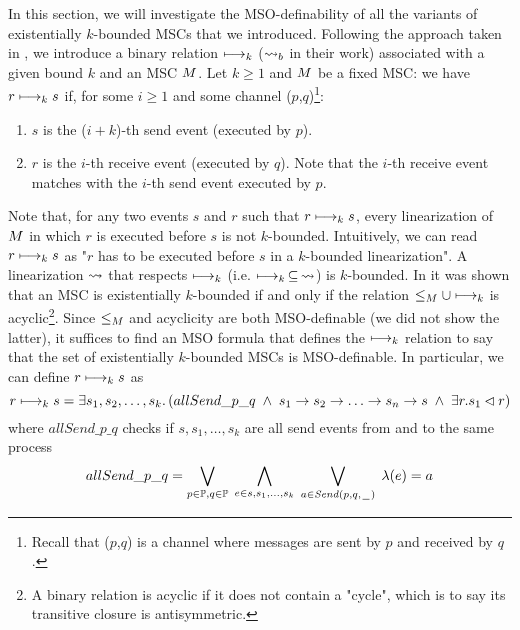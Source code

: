\documentclass{article}
\begin{document}
In this section, we will investigate the MSO-definability of all the variants of existentially $k$-bounded MSCs that we introduced. Following the approach taken in \cite{DBLP:conf/fossacs/LohreyM02}, we introduce a binary relation $\longmapsto_k$ ($\rightsquigarrow_b$ in their work) associated with a given bound $k$ and an MSC $M$. Let $k \ge 1$ and $M$ be a fixed MSC: we have $r \longmapsto_k s$ if, for some $i \ge 1$ and some channel ($p$,$q$)\footnote{Recall that ($p$,$q$) is a channel where messages are sent by $p$ and received by $q$.}:
\begin{enumerate}\itemsep=0.5ex
	\item $s$ is the ($i+k$)-th send event (executed by $p$).
	\item $r$ is the $i$-th receive event (executed by $q$). Note that the $i$-th receive event matches with the $i$-th send event executed by $p$.
\end{enumerate} 
Note that, for any two events $s$ and $r$ such that $r \longmapsto_k s$, every linearization of $M$ in which $r$ is executed before $s$ is not $k$-bounded. Intuitively, we can read $r \longmapsto_k s$ as "$r$ has to be executed before $s$ in a $k$-bounded linearization". A linearization $\rightsquigarrow$ that respects $\longmapsto_k$ (i.e. $\longmapsto_k \,\subseteq\, \rightsquigarrow$) is $k$-bounded. In \cite{DBLP:conf/fossacs/LohreyM02} it was shown that an MSC is existentially $k$-bounded if and only if the relation $\le_M \cup \longmapsto_k$ is acyclic\footnote{A binary relation is acyclic if it does not contain a "cycle", which is to say its transitive closure is antisymmetric.}. Since $\le_M$ and acyclicity are both MSO-definable (we did not show the latter), it suffices to find an MSO formula that defines the $\longmapsto_k$ relation to say that the set of existentially $k$-bounded MSCs is MSO-definable. In particular, we can define $r \longmapsto_k s$ as
\[
r \relb s=\exists s_1,s_2,\dots,s_k.\left(
allSend\_p\_q
\;\wedge\; s_1\procrel s_2\procrel\dots
\procrel s_n\procrel s
\;\wedge\; \exists r. s_1 \lhd r
\right)
\]
where $allSend\_p\_q$ checks if $s,s_1,\dots,s_k$ are all send events from and to the same process
\[
allSend\_p\_q=
\bigvee_{\substack{p \in \mathbb{P}, q \in \mathbb{P}}}\;
\bigwedge_{e \in {s, s_1, ..., s_k}}\;
\bigvee_{a \in {\mathit{Send}(p,q,\hspace{0.1em}\underline{\hspace{0.5em}}\hspace{0.1em})}}\;
\lambda(e) = a
\]
\end{document}
